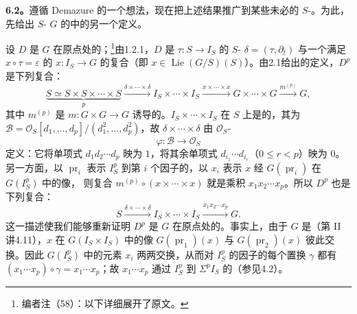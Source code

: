 \textbf{6.2。}遵循 Demazure 的一个想法，现在把上述结果推广到某些未必的 $S$-。为此，先给出 $S$- $G$ 的中的另一个定义。

设 $D$ 是 $G$ 在原点处的；\footnote{编者注（58）：以下详细展开了原文。}由1.2.1，$D$ 是 $\tau:S\to I_S$ 的 $S$- $\delta=(\tau,\partial_t)$ 与一个满足 $x\circ\tau=\varepsilon$ 的 $x:I_S\to G$ 的复合（即 $x\in\operatorname{Lie}(G/S)(S)$）。由2.1给出的定义，$D^p$ 是下列复合：
\[
 \underbrace{S\simeq S\times S\times\cdots\times S}_{p}
 \xrightarrow{\delta\times\cdots\times\delta}I_S\times\cdots\times I_S
 \xrightarrow{x\times\cdots\times x}G\times\cdots\times G
 \xrightarrow{m^{(p)}}G,
\]
其中 $m^{(p)}$ 是 $m:G\times G\to G$ 诱导的。$I_S\times\cdots\times I_S$ 在 $S$ 上是的，其为
$\mathcal B=\mathcal O_S[d_1,\ldots,d_p]/(d_1^2,\ldots,d_p^2)$，故 $\delta\times\cdots\times\delta$ 由 $\mathcal O_S$-
\[
 \varphi:\mathcal B\longrightarrow\mathcal O_S
\]
定义：它将单项式 $d_1d_2\cdots d_p$ 映为 $1$，将其余单项式 $d_{i_1}\cdots d_{i_r}$（$0\le r<p$）映为 $0$。另一方面，以 $\operatorname{pr}_i$ 表示 $I_S^p$ 到第 $i$ 个因子的，以 $x_i$ 表示 $x$ 经 $G(\operatorname{pr}_i)$ 在 $G(I_S^p)$ 中的像，
则复合 $m^{(p)}\circ(x\times\cdots\times x)$ 就是乘积 $x_1x_2\cdots x_p$。所以 $D^p$ 也是下列复合：
\[
 S\xrightarrow{\delta\times\cdots\times\delta}I_S\times\cdots\times I_S
 \xrightarrow{x_1x_2\cdots x_p}G.
\]
这一描述使我们能够重新证明 $D^p$ 是 $G$ 在原点处的。事实上，由于 $G$ 是（第 II 讲4.11），$x$ 在 $G(I_S\times I_S)$ 中的像 $G(\operatorname{pr}_1)(x)$ 与 $G(\operatorname{pr}_2)(x)$ 彼此交换。因此 $G(I_S^p)$ 中的元素 $x_i$ 两两交换，从而对 $I_S^p$ 的因子的每个置换 $\gamma$ 都有
$(x_1\cdots x_p)\circ\gamma=x_1\cdots x_p$；故 $x_1\cdots x_p$ 通过 $I_S^p$ 到 $\Sigma^pI_S$ 的（参见4.2）。

